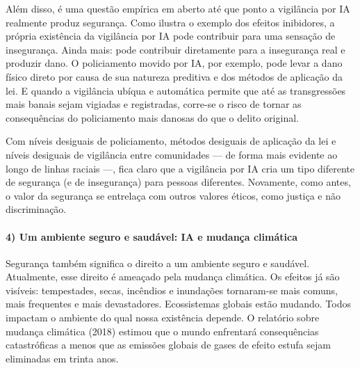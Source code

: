 \documentclass[
  11pt,
]{article}
\begin{document}
Além disso, é uma questão empírica em aberto até que ponto a vigilância
por IA realmente produz segurança. Como ilustra o exemplo dos efeitos
inibidores, a própria existência da vigilância por IA pode contribuir
para uma sensação de insegurança. Ainda mais: pode contribuir
diretamente para a insegurança real e produzir dano. O policiamento
movido por IA, por exemplo, pode levar a dano físico direto por causa de
sua natureza preditiva e dos métodos de aplicação da lei. E quando a
vigilância ubíqua e automática permite que até as transgressões mais
banais sejam vigiadas e registradas, corre-se o risco de tornar as
consequências do policiamento mais danosas do que o delito original.

Com níveis desiguais de policiamento, métodos desiguais de aplicação da
lei e níveis desiguais de vigilância entre comunidades --- de forma mais
evidente ao longo de linhas raciais ---, fica claro que a vigilância por
IA cria um tipo diferente de segurança (e de insegurança) para pessoas
diferentes. Novamente, como antes, o valor da segurança se entrelaça com
outros valores éticos, como justiça e não discriminação.

\paragraph{4) Um ambiente seguro e saudável: IA e mudança
climática}\label{um-ambiente-seguro-e-sauduxe1vel-ia-e-mudanuxe7a-climuxe1tica}

Segurança também significa o direito a um ambiente seguro e saudável.
Atualmente, esse direito é ameaçado pela mudança climática. Os efeitos
já são visíveis: tempestades, secas, incêndios e inundações tornaram-se
mais comuns, mais frequentes e mais devastadores. Ecossistemas globais
estão mudando. Todos impactam o ambiente do qual nossa existência
depende. O relatório sobre mudança climática (2018) estimou que o mundo
enfrentará consequências catastróficas a menos que as emissões globais
de gases de efeito estufa sejam eliminadas em trinta anos.
\end{document}
